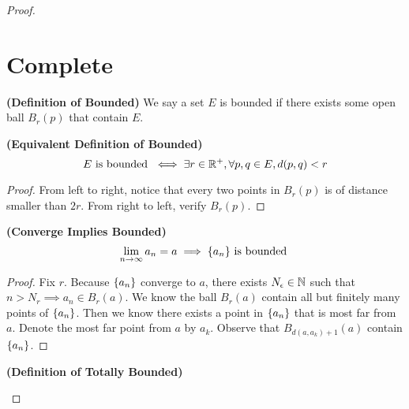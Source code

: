\documentclass{report}
\begin{document}
\begin{proof}
\section{Complete}
\begin{definition}
\label{3.7.1}
\textbf{(Definition of Bounded)} We say a set $E$ is bounded if there exists some open ball $B_r(p)$ that contain $E$.
\end{definition}
\begin{theorem}
\label{3.7.2}
\textbf{(Equivalent Definition of Bounded)} 
\begin{equation}
E\text{ is bounded }\iff \exists r\in\mathbb{R}^+, \forall p,q\in E, d(p,q)<r 
\end{equation}
\end{theorem}
\begin{proof}
From left to right, notice that every two points in $B_r(p)$ is of distance smaller than $2r$. From right to left, verify $B_r(p)$. 
\end{proof}
\begin{theorem}
\label{3.7.3}
\textbf{(Converge Implies Bounded)}
\begin{equation}
\lim_{n\to\infty} a_n=a\implies \{ a_n \}\text{ is bounded }
\end{equation}
\end{theorem}
\begin{proof}
Fix $r $. Because $\{ a_n \}$ converge to $a$, there exists $N_\epsilon \in\mathbb{N}$ such that $n> N_r \implies a_n\in B_r (a)$. We know the ball $B_r(a)$ contain all but finitely many points of $\{ a_n \}$. Then we know there exists a point in $\{ a_n \}$ that is most far from $a$. Denote the most far point from $a$ by $a_k$. Observe that  $B_{d(a,a_k)+1}(a)$ contain $\{ a_n \}$. 
\end{proof}
\begin{definition}
\label{3.7.4}
\textbf{(Definition of Totally Bounded)} 
\end{definition}

\end{proof}
\end{document}
